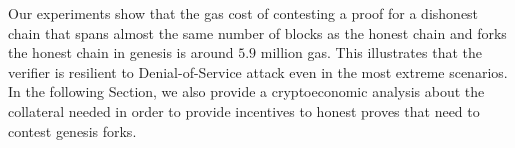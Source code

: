 Our experiments show that the gas cost of contesting a proof for a dishonest
chain that spans almost the same number of blocks as the honest chain and forks
the honest chain in genesis is around $5.9$ million gas. This illustrates that
the verifier is resilient to Denial-of-Service attack even in the most extreme
scenarios. In the following Section, we also provide a cryptoeconomic analysis
about the collateral needed in order to provide incentives to honest proves
that need to contest genesis forks.

